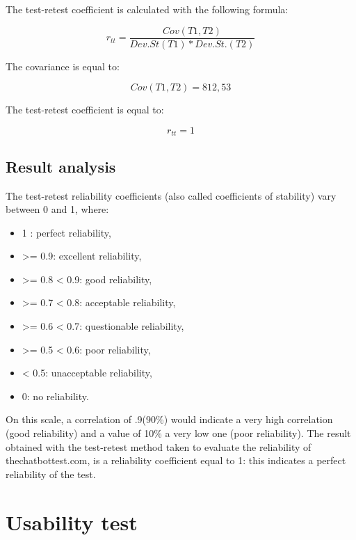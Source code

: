 \documentclass[b5paper,10pt,twoside,cucitura]{toptesi}
\begin{document}
\noindent The test-retest coefficient is calculated with the following formula:

\begin{equation}
r_{tt} = \frac{Cov (T1,T2)}{Dev.St(T1) \ast Dev.St.(T2)}
\end{equation}

\noindent The covariance is equal to:

\begin{equation}
Cov(T1,T2) = 812,53
\end{equation}

\noindent The test-retest coefficient is equal to:

\begin{equation}
r_{tt} = 1
\end{equation}

\subsection{Result analysis}
\noindent The test-retest reliability coefficients (also called coefficients of stability) vary between 0 and 1, where:
\begin{itemize}
\item 1 : perfect reliability,
\item >= 0.9: excellent reliability,
\item >= 0.8 < 0.9: good reliability,
\item >= 0.7 < 0.8: acceptable reliability,
\item >= 0.6 < 0.7: questionable reliability,
\item >= 0.5 < 0.6: poor reliability,
\item < 0.5: unacceptable reliability,
\item 0: no reliability.
\end{itemize}

On this scale, a correlation of .9(90\%) would indicate a very high correlation (good reliability) and a value of 10\% a very low one (poor reliability). The result obtained with the test-retest method taken to evaluate the reliability of thechatbottest.com, is a reliability coefficient equal to 1: this indicates a perfect reliability of the test.

\section{Usability test}
\end{document}
